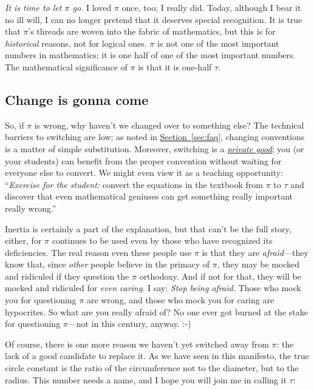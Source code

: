 \documentclass{article}
\begin{document}
\emph{It is time to let $\pi$ go.} I loved $\pi$ once, too; I really did. Today, although I bear it no ill will, I can no longer pretend that it deserves special recognition. It is true that $\pi$'s threads are woven into the fabric of mathematics, but this is for \emph{historical} reasons, not for logical ones. $\pi$ is not one of the most important numbers in mathematics; it is one half of one of the most important numbers. The mathematical significance of $\pi$ is that it is one-half $\tau$.

    \subsection{Change is gonna come} %
    \label{sec:change_is_gonna_come}
    

So, if $\pi$ is wrong, why haven't we changed over to something else? The technical barriers to switching are low; as noted in \hyperref[sec:faq]{Section~}\ref{sec:faq}, changing conventions is a matter of simple substitution. Moreover, switching is a \href{http://en.wikipedia.org/wiki/Private_good}{\emph{private good}}; you (or your students) can benefit from the proper convention without waiting for everyone else to convert. We might even view it as a teaching opportunity: ``\emph{Exercise for the student:} convert the equations in the textbook from $\pi$ to $\tau$ and discover that even mathematical geniuses can get something really important really wrong.''

Inertia is certainly a part of the explanation, but that can't be the full story, either, for $\pi$ continues to be used even by those who have recognized its deficiencies. The real reason even these people use $\pi$ is that they are \emph{afraid}---they know that, since \emph{other} people believe in the primacy of $\pi$, they may be mocked and ridiculed if they question the $\pi$ orthodoxy. And if not for that, they will be mocked and ridiculed for \emph{even caring}. I say: \emph{Stop being afraid.} Those who mock you for questioning $\pi$ are wrong, and those who mock you for caring are hypocrites. So what are you really afraid of? No one ever got burned at the stake for questioning $\pi$---not in this century, anyway. :-)

Of course, there is one more reason we haven't yet switched away from $\pi$: the lack of a good candidate to replace it. As we have seen in this manifesto, the true circle constant is the ratio of the circumference not to the diameter, but to the radius. This number needs a name, and I hope you will join me in calling it $\tau$:
\end{document}
